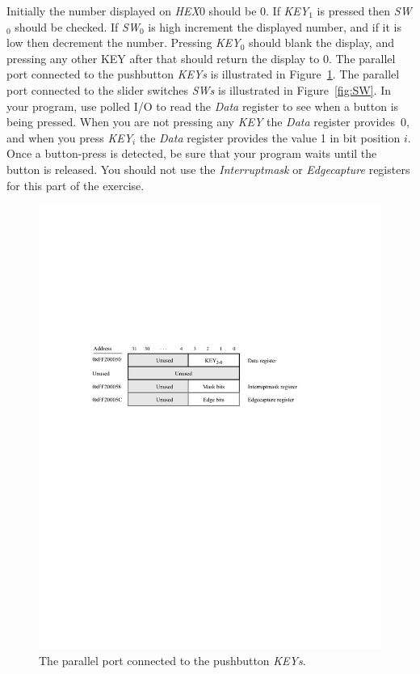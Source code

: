 \documentclass[epsfig,10pt,fullpage]{article}
\begin{document}
Initially the number displayed on {\it HEX}0 should be 0.  If {\it KEY}$_1$ is pressed then {\it SW}$_0$ 
should be checked. If {\it SW}$_0$ is high increment the displayed number, and 
if it is low then decrement the number. Pressing {\it KEY}$_0$ should 
blank the display, and pressing any other KEY after that should return the display to 0.
The parallel port connected to the pushbutton {\it KEYs} is illustrated in Figure~\ref{fig:KEY}. 
The parallel port connected to the slider switches {\it SWs} is illustrated in Figure~\ref{fig:SW}. 
In your program, use polled I/O 
to read the {\it Data} register to see when a button is being pressed. When you are not pressing 
any {\it KEY} the {\it Data} register provides~0, and when you press {\it KEY}$_i$ the 
{\it Data} register provides the value 1 in bit position $i$. Once a button-press is detected,
be sure that your program waits until the button is released. You should not use the 
{\it Interruptmask} or {\it Edgecapture} registers for this part of the exercise.

\begin{figure}[H]
	\begin{center}
	\includegraphics[scale=.9]{figures/figureKEY.pdf}
	\end{center}
	\caption{The parallel port connected to the pushbutton {\it KEYs}.}
\label{fig:KEY}
\end{figure}
\end{document}

